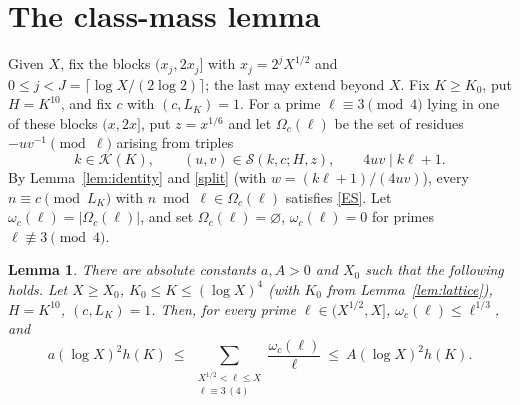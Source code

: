\documentclass[11pt,reqno]{amsart}
\newtheorem{lemma}[theorem]{Lemma}
\newcommand{\cS}{\mathcal S}
\newcommand{\cK}{\mathcal K}
\begin{document}
\section{The class-mass lemma}\label{sec:mass}

Given $X$, fix the blocks $(x_j,2x_j]$ with $x_j=2^jX^{1/2}$ and
$0\le j<J=\lceil\log X/(2\log2)\rceil$; the last may extend beyond $X$.
Fix $K\ge K_0$, put $H=K^{10}$, and fix $c$ with $(c,L_K)=1$.  For a prime
$\ell\equiv3\pmod 4$ lying in one of these blocks $(x,2x]$, put $z=x^{1/6}$ and
let $\Omega_c(\ell)$ be the set of residues $-uv^{-1}\pmod\ell$ arising
from triples
\begin{equation}\label{triples}
 k\in\cK(K),\qquad (u,v)\in\cS(k,c;H,z),\qquad 4uv\mid k\ell+1 .
\end{equation}
By Lemma~\ref{lem:identity} and \eqref{split} (with $w=(k\ell+1)/(4uv)$),
every $n\equiv c\pmod{L_K}$ with $n\bmod\ell\in\Omega_c(\ell)$ satisfies
\eqref{ES}.  Let $\omega_c(\ell)=|\Omega_c(\ell)|$, and set
$\Omega_c(\ell)=\varnothing$, $\omega_c(\ell)=0$ for primes $\ell\not\equiv3\pmod4$.

\begin{lemma}\label{lem:mass}
There are absolute constants $a,A>0$ and $X_0$ such that the following holds.
Let $X\ge X_0$, $K_0\le K\le(\log X)^4$ (with $K_0$ from Lemma~\ref{lem:lattice}), $H=K^{10}$, $(c,L_K)=1$.  Then, for every
prime $\ell\in(X^{1/2},X]$, $\omega_c(\ell)\le\ell^{1/3}$, and
\begin{equation}\label{mass}
 a(\log X)^2h(K)\ \le\ \sum_{\substack{X^{1/2}<\ell\le X\\ \ell\equiv3\,(4)}}\frac{\omega_c(\ell)}{\ell}\ \le\ A(\log X)^2h(K).
\end{equation}
\end{lemma}
\end{document}
